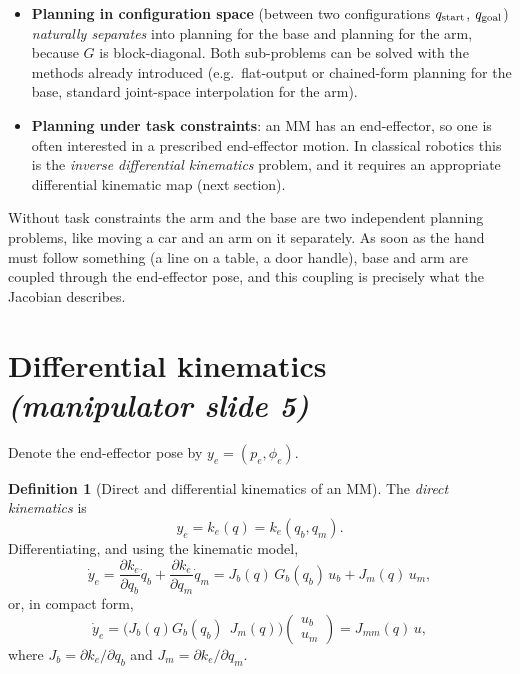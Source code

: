 \documentclass[11pt,a4paper]{article}
\def\bm#1{#1}%
\newcommand{\qbase}{\bm{q}_b}
\newcommand{\qarm}{\bm{q}_m}
\newcommand{\ubase}{\bm{u}_b}
\newcommand{\uarm}{\bm{u}_m}
\newcommand{\Gbase}{\bm{G}_b}
\newcommand{\Jbase}{\bm{J}_b}
\newcommand{\Jarm}{\bm{J}_m}
\newcommand{\Jmm}{\bm{J}_{mm}}
\newcommand{\ye}{\bm{y}_e}
\theoremstyle{definition}
\newtheorem{definition}{Definition}[section]
\theoremstyle{plain}
\theoremstyle{remark}
\begin{document}
\begin{itemize}[leftmargin=*]
\item \textbf{Planning in configuration space} (between two configurations $\bm q_{\rm start}$, $\bm q_{\rm goal}$) \emph{naturally separates} into planning for the base and planning for the arm, because $\bm G$ is block-diagonal. Both sub-problems can be solved with the methods already introduced (e.g.\ flat-output or chained-form planning for the base, standard joint-space interpolation for the arm).
\item \textbf{Planning under task constraints}: an MM has an end-effector, so one is often interested in a prescribed end-effector motion. In classical robotics this is the \emph{inverse differential kinematics} problem, and it requires an appropriate differential kinematic map (next section).
\end{itemize}

\begin{intuition}
Without task constraints the arm and the base are two independent planning problems, like moving a car and an arm on it separately. As soon as the hand must follow something (a line on a table, a door handle), base and arm are coupled through the end-effector pose, and this coupling is precisely what the Jacobian describes.
\end{intuition}

\section{Differential kinematics \emph{(manipulator slide 5)}}

Denote the end-effector pose by $\ye=(\bm p_e,\phi_e)$.

\begin{definition}[Direct and differential kinematics of an MM]
The \emph{direct kinematics} is
\[
\ye=\bm k_e(\bm q)=\bm k_e(\qbase,\qarm).
\]
Differentiating, and using the kinematic model,
\[
\dot{\bm y}_e=\frac{\partial\bm k_e}{\partial\qbase}\dot{\bm q}_b+\frac{\partial\bm k_e}{\partial\qarm}\dot{\bm q}_m
=\Jbase(\bm q)\,\Gbase(\qbase)\,\ubase+\Jarm(\bm q)\,\uarm ,
\]
or, in compact form,
\[
\dot{\bm y}_e=\bigl(\Jbase(\bm q)\Gbase(\qbase)\ \ \Jarm(\bm q)\bigr)\begin{pmatrix}\ubase\\ \uarm\end{pmatrix}=\Jmm(\bm q)\,\bm u,
\]
where $\Jbase=\partial\bm k_e/\partial\qbase$ and $\Jarm=\partial\bm k_e/\partial\qarm$.
\end{definition}
\end{document}
